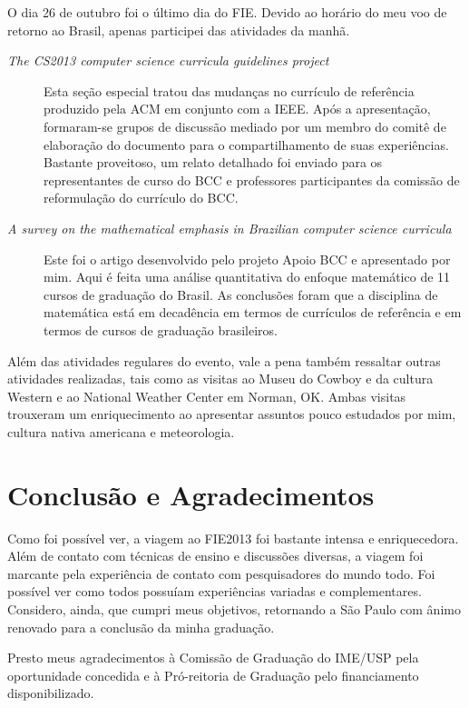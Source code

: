 \documentclass{article}
\begin{document}
O dia 26 de outubro foi o último dia do FIE. Devido ao horário do meu voo de retorno ao Brasil, apenas participei das atividades da manhã.

\begin{description}
	\item[\emph{The CS2013 computer science curricula guidelines project}] Esta seção especial tratou das mudanças no currículo de referência produzido pela ACM em conjunto com a IEEE. Após a apresentação, formaram-se grupos de discussão mediado por um membro do comitê de elaboração do documento para o compartilhamento de suas experiências. Bastante proveitoso, um relato detalhado foi enviado para os representantes de curso do BCC e professores participantes da comissão de reformulação do currículo do BCC.
	\item[\emph{A survey on the mathematical emphasis in Brazilian computer science curricula}] Este foi o artigo desenvolvido pelo projeto Apoio BCC e apresentado por mim. Aqui é feita uma análise quantitativa do enfoque matemático de 11 cursos de graduação do Brasil. As conclusões foram que a disciplina de matemática está em decadência em termos de currículos de referência e em termos de cursos de graduação brasileiros.
\end{description}

Além das atividades regulares do evento, vale a pena também ressaltar outras atividades realizadas, tais como as visitas ao Museu do Cowboy e da cultura Western e ao National Weather Center em Norman, OK. Ambas visitas trouxeram um enriquecimento ao apresentar assuntos pouco estudados por mim, cultura nativa americana e meteorologia.

\section{Conclusão e Agradecimentos}
Como foi possível ver, a viagem ao FIE2013 foi bastante intensa e enriquecedora. Além de contato com técnicas de ensino e discussões diversas, a viagem foi marcante pela experiência de contato com pesquisadores do mundo todo. Foi possível ver como todos possuíam experiências variadas e complementares. Considero, ainda, que cumpri meus objetivos, retornando a São Paulo com ânimo renovado para a conclusão da minha graduação. 

Presto meus agradecimentos à Comissão de Graduação do IME/USP pela oportunidade concedida e à Pró-reitoria de Graduação pelo financiamento disponibilizado.

%
%
\end{document}
